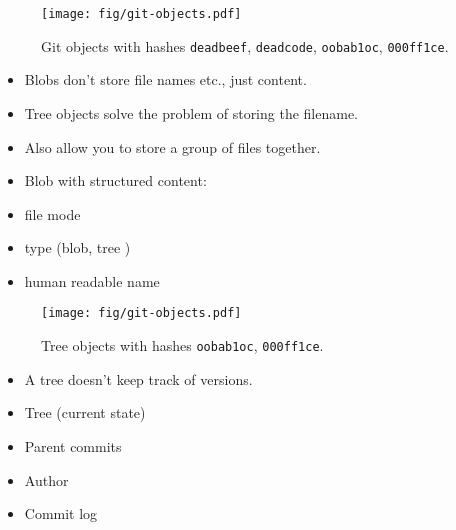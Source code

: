 \begin{frame}
  \begin{figure}
    \centering
    \texttt{[image: fig/git-objects.pdf]}
    \caption{Git objects with hashes \texttt{deadbeef}, \texttt{deadcode}, 
    \texttt{oobab1oc}, \texttt{000ff1ce}.}
  \end{figure}
\end{frame}

\begin{frame}
  \begin{remark}
    \begin{itemize}
      \item Blobs don't store file names etc., just content.
      \item Tree objects solve the problem of storing the filename.
      \item Also allow you to store a group of files together.
    \end{itemize}
  \end{remark}

  \pause

  \begin{definition}
    \begin{itemize}
      \item Blob with structured content:
      \item file mode
      \item type (blob, tree \etc)
      \item human readable name
    \end{itemize}
  \end{definition}
\end{frame}

\begin{frame}
  \begin{figure}
    \centering
    \texttt{[image: fig/git-objects.pdf]}
    \caption{Tree objects with hashes \texttt{oobab1oc}, \texttt{000ff1ce}.}
  \end{figure}
\end{frame}

\begin{frame}
  \begin{remark}
    \begin{itemize}
      \item A tree doesn't keep track of versions.
    \end{itemize}
  \end{remark}

  \begin{definition}[Commit]
    \begin{itemize}
      \item Tree (current state)
      \item Parent commits
      \item Author
      \item Commit log
    \end{itemize}
  \end{definition}
\end{frame}

